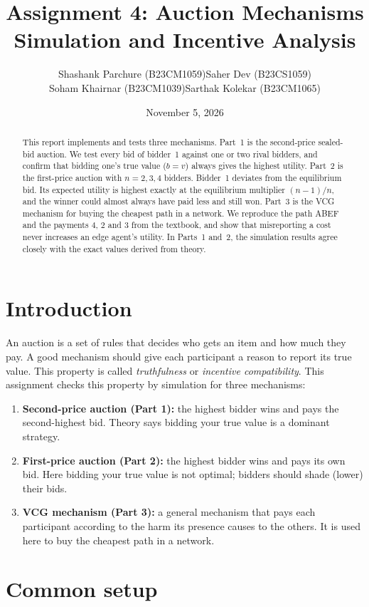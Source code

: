 \documentclass[11pt,a4paper]{article}
\title{Assignment 4: Auction Mechanisms\\\large Simulation and Incentive Analysis}
\author{%
  \begin{tabular}{cc}
    Shashank Parchure (B23CM1059) & Saher Dev (B23CS1059)\\
    Soham Khairnar (B23CM1039)    & Sarthak Kolekar (B23CM1065)
  \end{tabular}%
}
\date{November 5, 2026}
\begin{document}
\maketitle

\begin{abstract}
This report implements and tests three mechanisms. Part~1 is the second-price sealed-bid auction. We test every bid of bidder~1 against one or two rival bidders, and confirm that bidding one's true value ($b=v$) always gives the highest utility. Part~2 is the first-price auction with $n=2,3,4$ bidders. Bidder~1 deviates from the equilibrium bid. Its expected utility is highest exactly at the equilibrium multiplier $(n-1)/n$, and the winner could almost always have paid less and still won. Part~3 is the VCG mechanism for buying the cheapest path in a network. We reproduce the path ABEF and the payments $4$, $2$ and $3$ from the textbook, and show that misreporting a cost never increases an edge agent's utility. In Parts~1 and~2, the simulation results agree closely with the exact values derived from theory.
\end{abstract}

\section{Introduction}

An auction is a set of rules that decides who gets an item and how much they pay. A good mechanism should give each participant a reason to report its true value. This property is called \emph{truthfulness} or \emph{incentive compatibility}. This assignment checks this property by simulation for three mechanisms:

\begin{enumerate}
  \item \textbf{Second-price auction (Part 1):} the highest bidder wins and pays the second-highest bid. Theory says bidding your true value is a dominant strategy.
  \item \textbf{First-price auction (Part 2):} the highest bidder wins and pays its own bid. Here bidding your true value is not optimal; bidders should shade (lower) their bids.
  \item \textbf{VCG mechanism (Part 3):} a general mechanism that pays each participant according to the harm its presence causes to the others. It is used here to buy the cheapest path in a network.
\end{enumerate}


\section{Common setup}
\end{document}
